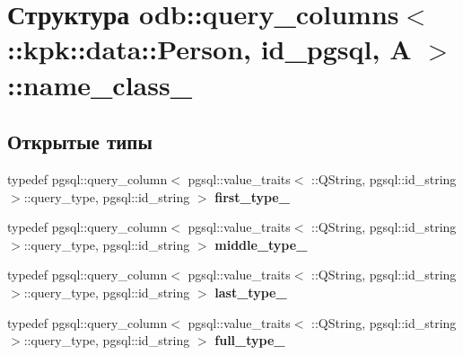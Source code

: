 \hypertarget{structodb_1_1query__columns_3_01_1_1kpk_1_1data_1_1_person_00_01id__pgsql_00_01_a_01_4_1_1name__class__}{}\section{Структура odb\+:\+:query\+\_\+columns$<$ \+:\+:kpk\+:\+:data\+:\+:Person, id\+\_\+pgsql, A $>$\+:\+:name\+\_\+class\+\_\+}
\label{structodb_1_1query__columns_3_01_1_1kpk_1_1data_1_1_person_00_01id__pgsql_00_01_a_01_4_1_1name__class__}
\subsection*{Открытые типы}
\begin{DoxyCompactItemize}
\item 
typedef pgsql\+::query\+\_\+column$<$ pgsql\+::value\+\_\+traits$<$ \+::Q\+String, pgsql\+::id\+\_\+string $>$\+::query\+\_\+type, pgsql\+::id\+\_\+string $>$ {\bfseries first\+\_\+type\+\_\+}\hypertarget{structodb_1_1query__columns_3_01_1_1kpk_1_1data_1_1_person_00_01id__pgsql_00_01_a_01_4_1_1name__class___a3d0fcf52d663916e82682133a212cc2b}{}\label{structodb_1_1query__columns_3_01_1_1kpk_1_1data_1_1_person_00_01id__pgsql_00_01_a_01_4_1_1name__class___a3d0fcf52d663916e82682133a212cc2b}

\item 
typedef pgsql\+::query\+\_\+column$<$ pgsql\+::value\+\_\+traits$<$ \+::Q\+String, pgsql\+::id\+\_\+string $>$\+::query\+\_\+type, pgsql\+::id\+\_\+string $>$ {\bfseries middle\+\_\+type\+\_\+}\hypertarget{structodb_1_1query__columns_3_01_1_1kpk_1_1data_1_1_person_00_01id__pgsql_00_01_a_01_4_1_1name__class___a1d4118198c443c2460202d4feb78309f}{}\label{structodb_1_1query__columns_3_01_1_1kpk_1_1data_1_1_person_00_01id__pgsql_00_01_a_01_4_1_1name__class___a1d4118198c443c2460202d4feb78309f}

\item 
typedef pgsql\+::query\+\_\+column$<$ pgsql\+::value\+\_\+traits$<$ \+::Q\+String, pgsql\+::id\+\_\+string $>$\+::query\+\_\+type, pgsql\+::id\+\_\+string $>$ {\bfseries last\+\_\+type\+\_\+}\hypertarget{structodb_1_1query__columns_3_01_1_1kpk_1_1data_1_1_person_00_01id__pgsql_00_01_a_01_4_1_1name__class___a5c8518450349d6440caa18f178976d3f}{}\label{structodb_1_1query__columns_3_01_1_1kpk_1_1data_1_1_person_00_01id__pgsql_00_01_a_01_4_1_1name__class___a5c8518450349d6440caa18f178976d3f}

\item 
typedef pgsql\+::query\+\_\+column$<$ pgsql\+::value\+\_\+traits$<$ \+::Q\+String, pgsql\+::id\+\_\+string $>$\+::query\+\_\+type, pgsql\+::id\+\_\+string $>$ {\bfseries full\+\_\+type\+\_\+}\hypertarget{structodb_1_1query__columns_3_01_1_1kpk_1_1data_1_1_person_00_01id__pgsql_00_01_a_01_4_1_1name__class___a3356f0c9bebb1fb7b699aa64ba655d36}{}\label{structodb_1_1query__columns_3_01_1_1kpk_1_1data_1_1_person_00_01id__pgsql_00_01_a_01_4_1_1name__class___a3356f0c9bebb1fb7b699aa64ba655d36}

\end{DoxyCompactItemize}
